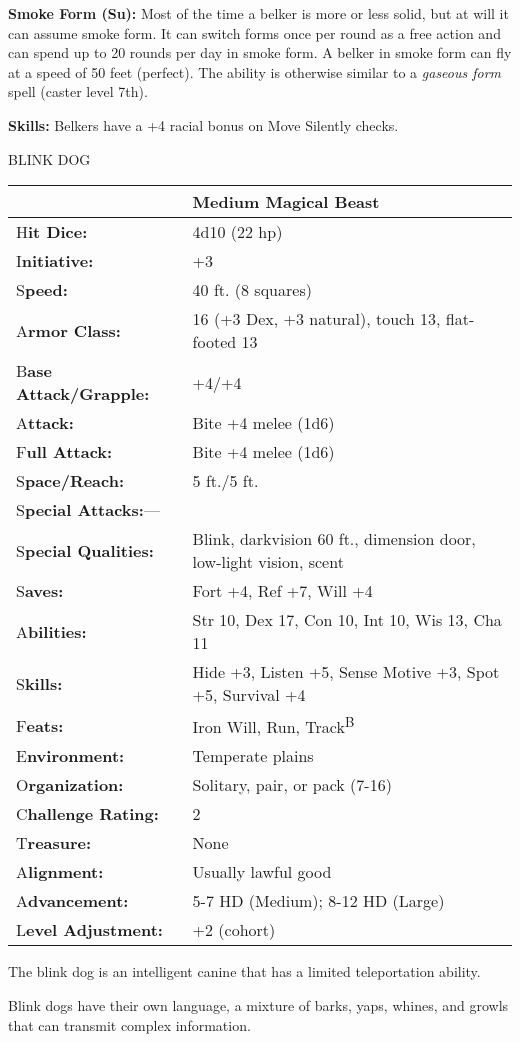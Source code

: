 \documentclass{article}
\begin{document}
\textbf{Smoke Form (Su):} Most of the time a belker is more or less solid, but 
at will it can assume smoke form. It can switch forms once per round as a free 
action and can spend up to 20 rounds per day in smoke form. A belker in smoke form 
can fly at a speed of 50 feet (perfect). The ability is otherwise similar to a 
\textit{gaseous form }spell (caster level 7th).

\textbf{Skills:} Belkers have a +4 racial bonus on Move Silently checks.

\vspace{12pt}
{\LARGE{}BLINK DOG}

\begin{tabular}{|>{\raggedright}p{91pt}|>{\raggedright}p{204pt}|}
\hline
  & Medium Magical Beast\tabularnewline
\hline
H\textbf{it Dice:} & 4d10 (22 hp)\tabularnewline
\hline
I\textbf{nitiative:} & +3\tabularnewline
\hline
S\textbf{peed:} & 40 ft. (8 squares)\tabularnewline
\hline
A\textbf{rmor Class:} & 16 (+3 Dex, +3 natural), touch 13, flat-footed 13\tabularnewline
\hline
B\textbf{ase Attack/Grapple:} & +4/+4\tabularnewline
\hline
A\textbf{ttack:} & Bite +4 melee (1d6)\tabularnewline
\hline
F\textbf{ull Attack:} & Bite +4 melee (1d6)\tabularnewline
\hline
S\textbf{pace/Reach:} & 5 ft./5 ft.\tabularnewline
\hline
S\textbf{pecial Attacks:}--- & \tabularnewline
\hline
S\textbf{pecial Qualities:} & Blink, darkvision 60 ft., dimension door, low-light 
vision, scent\tabularnewline
\hline
S\textbf{aves:} & Fort +4, Ref +7, Will +4\tabularnewline
\hline
A\textbf{bilities:} & Str 10, Dex 17, Con 10, Int 10, Wis 13, Cha 11\tabularnewline
\hline
S\textbf{kills:} & Hide +3, Listen +5, Sense Motive +3, Spot +5, Survival +4\tabularnewline
\hline
F\textbf{eats:} & Iron Will, Run, Track\textsuperscript{B}\tabularnewline
\hline
E\textbf{nvironment:} & Temperate plains\tabularnewline
\hline
O\textbf{rganization:} & Solitary, pair, or pack (7-16)\tabularnewline
\hline
C\textbf{hallenge Rating:} & 2\tabularnewline
\hline
T\textbf{reasure:} & None\tabularnewline
\hline
A\textbf{lignment:} & Usually lawful good\tabularnewline
\hline
A\textbf{dvancement:} & 5-7 HD (Medium); 8-12 HD (Large)\tabularnewline
\hline
L\textbf{evel Adjustment:} & +2 (cohort)\tabularnewline
\hline
\end{tabular}

The blink dog is an intelligent canine that has a limited teleportation ability.

Blink dogs have their own language, a mixture of barks, yaps, whines, and growls 
that can transmit complex information.
\end{document}
